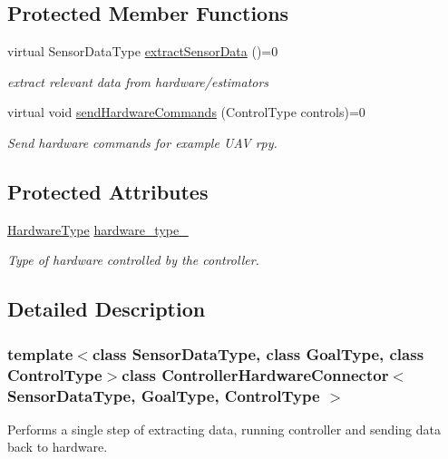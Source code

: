 \subsection*{Protected Member Functions}
\begin{DoxyCompactItemize}
\item 
virtual Sensor\-Data\-Type \hyperlink{classControllerHardwareConnector_af6952c0d8829b93557eb7d8887bebd63}{extract\-Sensor\-Data} ()=0
\begin{DoxyCompactList}\small\item\em extract relevant data from hardware/estimators \end{DoxyCompactList}\item 
virtual void \hyperlink{classControllerHardwareConnector_a5fc86156d5c747aba36497732962d6d0}{send\-Hardware\-Commands} (Control\-Type controls)=0
\begin{DoxyCompactList}\small\item\em Send hardware commands for example U\-A\-V rpy. \end{DoxyCompactList}\end{DoxyCompactItemize}
\subsection*{Protected Attributes}
\begin{DoxyCompactItemize}
\item 
\hyperlink{base__controller__hardware__connector_8h_ae4dfd42394001deb6e8a0e60c81d6f7a}{Hardware\-Type} \hyperlink{classControllerHardwareConnector_a1e47c12f796c9cc2fcb5c2495ede2392}{hardware\-\_\-type\-\_\-}
\begin{DoxyCompactList}\small\item\em Type of hardware controlled by the controller. \end{DoxyCompactList}\end{DoxyCompactItemize}


\subsection{Detailed Description}
\subsubsection*{template$<$class Sensor\-Data\-Type, class Goal\-Type, class Control\-Type$>$class Controller\-Hardware\-Connector$<$ Sensor\-Data\-Type, Goal\-Type, Control\-Type $>$}

Performs a single step of extracting data, running controller and sending data back to hardware. 


